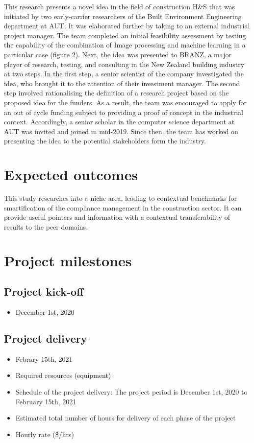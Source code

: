 \documentclass{article}
\begin{document}
This research presents a novel idea in the field of construction H\&S that was initiated by two early-carrier researchers of the Built Environment Engineering department at AUT. It was elaborated further by taking to an external industrial project manager. The team completed an initial feasibility assessment by testing the capability of the combination of Image processing and machine learning in a particular case (figure 2).
Next, the idea was presented to BRANZ, a major player of research, testing, and consulting in the New Zealand building industry at two steps. In the first step, a senior scientist of the company investigated the idea, who brought it to the attention of their investment manager. The second step involved rationalising the definition of a research project based on the proposed idea for the funders. As a result, the team was encouraged to apply for an out of cycle funding subject to providing a proof of concept in the industrial context. Accordingly, a senior scholar in the computer science department at AUT was invited and joined in mid-2019. Since then, the team has worked on presenting the idea to the potential stakeholders form the industry. 
\section{Expected outcomes}
\label{sec:org3751446}
This study researches into a niche area, leading to contextual benchmarks for smartification of the compliance management in the construction sector. It can provide useful pointers and information with a contextual transferability of results to the peer domains.

\section{Project milestones}
\label{sec:org284e06e}
\subsection{Project kick-off}
\label{sec:org12420c2}
\begin{itemize}
\item December 1st, 2020
\end{itemize}
\subsection{Project delivery}
\label{sec:orgb23d6a4}
\begin{itemize}
\item Febrary 15th, 2021
\end{itemize}
\begin{itemize}
\item Required resources (equipment)
\item Schedule of the project delivery: The project period is December 1st, 2020 to February 15th, 2021
\item Estimated total number of hours for delivery of each phase of the project
\item Hourly rate (\$/hrs)
\end{itemize}
\end{document}
